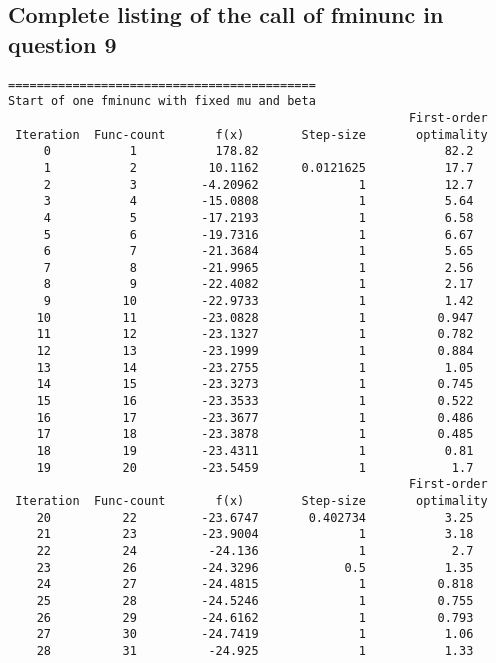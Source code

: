 \documentclass{article}
\begin{document}
\subsection*{Complete listing of the call of fminunc in question 9}
\begin{lstlisting}
===========================================
Start of one fminunc with fixed mu and beta
                                                        First-order 
 Iteration  Func-count       f(x)        Step-size       optimality
     0           1           178.82                          82.2
     1           2          10.1162      0.0121625           17.7  
     2           3         -4.20962              1           12.7  
     3           4         -15.0808              1           5.64  
     4           5         -17.2193              1           6.58  
     5           6         -19.7316              1           6.67  
     6           7         -21.3684              1           5.65  
     7           8         -21.9965              1           2.56  
     8           9         -22.4082              1           2.17  
     9          10         -22.9733              1           1.42  
    10          11         -23.0828              1          0.947  
    11          12         -23.1327              1          0.782  
    12          13         -23.1999              1          0.884  
    13          14         -23.2755              1           1.05  
    14          15         -23.3273              1          0.745  
    15          16         -23.3533              1          0.522  
    16          17         -23.3677              1          0.486  
    17          18         -23.3878              1          0.485  
    18          19         -23.4311              1           0.81  
    19          20         -23.5459              1            1.7  
                                                        First-order 
 Iteration  Func-count       f(x)        Step-size       optimality
    20          22         -23.6747       0.402734           3.25  
    21          23         -23.9004              1           3.18  
    22          24          -24.136              1            2.7  
    23          26         -24.3296            0.5           1.35  
    24          27         -24.4815              1          0.818  
    25          28         -24.5246              1          0.755  
    26          29         -24.6162              1          0.793  
    27          30         -24.7419              1           1.06  
    28          31          -24.925              1           1.33  

\end{lstlisting}
\end{document}

